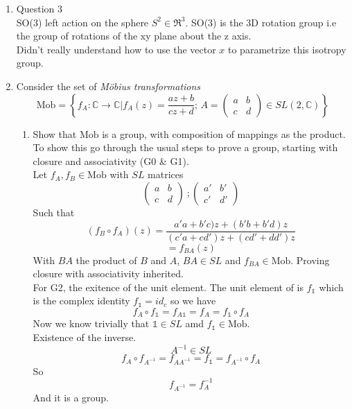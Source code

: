 \documentclass[12pt]{article}
\newcommand{\Mob}{\text{Mob}}
\begin{document}
\begin{enumerate}
\begin{figure}[H]
\end{figure}
\pagebreak
\item Question 3
\\
SO(3) left action on the sphere $S^2 \in \Re^3$. SO(3) is the 3D rotation group i.e the group of rotations of the xy plane about the z axis. 
\\
Didn't really understand how to use the vector $x$ to parametrize this isotropy group. 
\item Consider the set of {\em M\"obius transformations}
\begin{equation}
\Mob  = \left\{f_A:\mathbb{C}\to\mathbb{C}|f_A(z) = \frac{az+b}{cz+d};\,A=\left(\begin{array}{cc} a&b\\ c&d  \end{array} \right)\in SL(2,\mathbb{C})  \right\}
\end{equation}
\begin{enumerate}
\item Show that $\Mob $ is a group, with composition of mappings as the product.
\\
To show this go through the usual steps to prove a group, starting with closure and associativity (G0 \& G1). \\
Let $f_A, f_B \in \Mob$ with $SL$ matrices 
$$ \left(\begin{array}{cc} a&b\\ c&d  \end{array} \right) \ ; \left(\begin{array}{cc} a'&b'\\ c'&d'  \end{array} \right)$$
Such that 
$$ (f_B \circ f_A ) (z) = \frac{a'a + b'c)z + (b'b+b'd)z}{(c'a + cd')z + (cd' + dd')z} $$
$$ = f_{BA} (z)$$
With $BA$ the product of $B$ and $A$, $BA \in SL$ and $f_{BA} \in \Mob$. Proving closure with associativity inherited. \\
For G2, the exitence of the unit element. The unit element of \Mob is $f_{\mathbb{1}}$ which is the complex identity $f_{\mathbb{1}} = id_c$ so we have
$$ f_A \circ f_{\mathbb{1}} = f_{A\mathbb{1}} = f_A = f_{\mathbb{1}} \circ f_A $$
Now we know trivially that $\mathbb{1} \in SL$ amd $f_{\mathbb{1}} \in \Mob$. \\
Existence of the inverse. 
$$ A^{-1} \in SL $$
$$ f_A \circ f_{A^{-1}} = f_{AA^{-1}} = f_{\mathbb{1}} = f_{A^{-1}} \circ f_A $$
So 
$$ f_{A^{-1}} = f_A^{-1} $$ 
And it is a group. 


\end{enumerate}
\end{enumerate}
\end{document}
